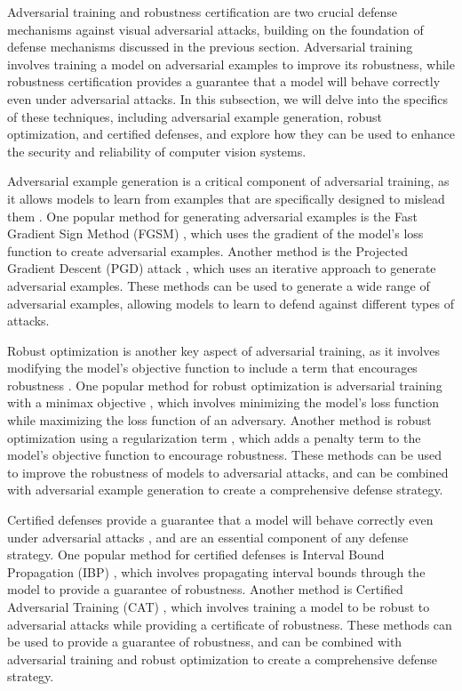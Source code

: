 \documentclass[11pt]{article}
\begin{document}
Adversarial training and robustness certification are two crucial defense mechanisms against visual adversarial attacks, building on the foundation of defense mechanisms discussed in the previous section. Adversarial training involves training a model on adversarial examples to improve its robustness, while robustness certification provides a guarantee that a model will behave correctly even under adversarial attacks. In this subsection, we will delve into the specifics of these techniques, including adversarial example generation, robust optimization, and certified defenses, and explore how they can be used to enhance the security and reliability of computer vision systems.

Adversarial example generation is a critical component of adversarial training, as it allows models to learn from examples that are specifically designed to mislead them \cite{ref62}. One popular method for generating adversarial examples is the Fast Gradient Sign Method (FGSM) \cite{ref110}, which uses the gradient of the model's loss function to create adversarial examples. Another method is the Projected Gradient Descent (PGD) attack \cite{ref111}, which uses an iterative approach to generate adversarial examples. These methods can be used to generate a wide range of adversarial examples, allowing models to learn to defend against different types of attacks.

Robust optimization is another key aspect of adversarial training, as it involves modifying the model's objective function to include a term that encourages robustness \cite{ref112}. One popular method for robust optimization is adversarial training with a minimax objective \cite{ref113}, which involves minimizing the model's loss function while maximizing the loss function of an adversary. Another method is robust optimization using a regularization term \cite{ref114}, which adds a penalty term to the model's objective function to encourage robustness. These methods can be used to improve the robustness of models to adversarial attacks, and can be combined with adversarial example generation to create a comprehensive defense strategy.

Certified defenses provide a guarantee that a model will behave correctly even under adversarial attacks \cite{ref115}, and are an essential component of any defense strategy. One popular method for certified defenses is Interval Bound Propagation (IBP) \cite{ref116}, which involves propagating interval bounds through the model to provide a guarantee of robustness. Another method is Certified Adversarial Training (CAT) \cite{ref117}, which involves training a model to be robust to adversarial attacks while providing a certificate of robustness. These methods can be used to provide a guarantee of robustness, and can be combined with adversarial training and robust optimization to create a comprehensive defense strategy.
\end{document}
